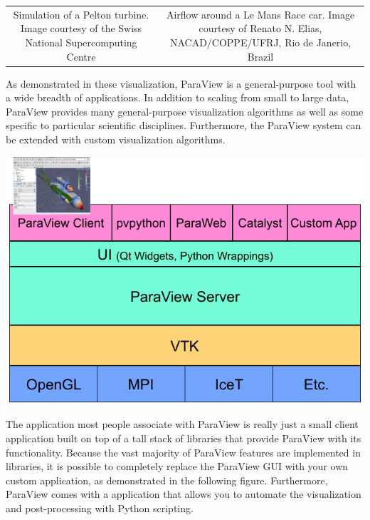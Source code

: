 \begin{inlinefig}
\begin{tabular}{cc}
    \parbox[t]{.29\linewidth}{\footnotesize Simulation of a Pelton turbine.
      Image courtesy of the Swiss National Supercomputing Centre} &
    \parbox[t]{.61\linewidth}{\footnotesize Airflow around a Le Mans Race
      car.  Image courtesy of Renato N. Elias, NACAD/COPPE/UFRJ, Rio de
      Janerio, Brazil}
  \end{tabular}
\end{inlinefig}

As demonstrated in these visualization, ParaView is a general-purpose tool
with a wide breadth of applications.  In addition to scaling from small to
large data, ParaView provides many general-purpose visualization algorithms
as well as some specific to particular scientific disciplines.
Furthermore, the ParaView system can be extended with custom visualization
algorithms.

\begin{inlinefig}
  \includegraphics[scale=\bbscale]{images/ParaViewLibStack}
\end{inlinefig}

The application most people associate with ParaView is really just a small
client application built on top of a tall stack of libraries that provide
ParaView with its functionality.  Because the vast majority of ParaView
features are implemented in libraries, it is possible to completely replace
the ParaView GUI with your own custom application, as demonstrated in the
following figure.  Furthermore, ParaView comes with a 
application that allows you to automate the visualization and
post-processing with Python scripting.

